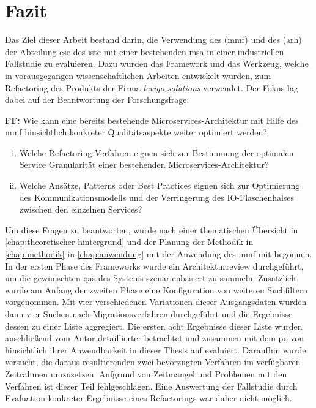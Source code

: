 \chapter{Fazit}
\label{chap:fazit}

Das Ziel dieser Arbeit bestand darin, die Verwendung des  (\acrshort{mmf}) und des  (\acrshort{arh}) der Abteilung \acrfull{ese} des \acrfull{iste} mit einer bestehenden \acrfull{msa} in einer industriellen Fallstudie zu evaluieren.
Dazu wurden das Framework und das Werkzeug, welche in vorausgegangen wissenschaftlichen Arbeiten entwickelt wurden, zum Refactoring des Produkts \jf der Firma \emph{levigo solutions} verwendet.
Der Fokus lag dabei auf der Beantwortung der Forschungsfrage:

\textbf{FF:} Wie kann eine bereits bestehende Microservices-Architektur mit Hilfe des \acrfull{mmf} hinsichtlich konkreter Qualitätsaspekte weiter optimiert werden?
\begin{enumerate}[i.]
	\item Welche Refactoring-Verfahren eignen sich zur Bestimmung der optimalen Service Granularität einer bestehenden Microservices-Architektur?
	\item Welche Ansätze, Patterns oder Best Practices eignen sich zur Optimierung des Kom\-mu\-ni\-ka\-tions\-mo\-dells und der Verringerung des IO-Flaschenhalses zwischen den einzelnen Services?
\end{enumerate}
Um diese Fragen zu beantworten, wurde nach einer thematischen Übersicht in \cref{chap:theoretischer-hintergrund} und der Planung der Methodik in \cref{chap:methodik} in \cref{chap:anwendung} mit der Anwendung des \gls{mmf} mit \jf begonnen.
In der ersten Phase des Frameworks wurde ein Architekturreview durchgeführt, um die gewünschten \glspl{qa} des Systems szenarienbasiert zu sammeln.
Zusätzlich wurde am Anfang der zweiten Phase eine Konfiguration von weiteren Suchfiltern vorgenommen.
Mit vier verschiedenen Variationen dieser Ausgangsdaten wurden dann vier Suchen nach Migrationsverfahren durchgeführt und die Ergebnisse dessen zu einer Liste aggregiert.
Die ersten acht Ergebnisse dieser Liste wurden anschließend vom Autor detaillierter betrachtet und zusammen mit dem \gls{po} von \jf hinsichtlich ihrer Anwendbarkeit in dieser Thesis auf \jf evaluiert.
Daraufhin wurde versucht, die daraus resultierenden zwei bevorzugten Verfahren im verfügbaren Zeitrahmen umzusetzen.
Aufgrund von Zeitmangel und Problemen mit den Verfahren ist dieser Teil fehlgeschlagen.
Eine Auswertung der Fallstudie durch Evaluation konkreter Ergebnisse eines Refactorings war daher nicht möglich.

